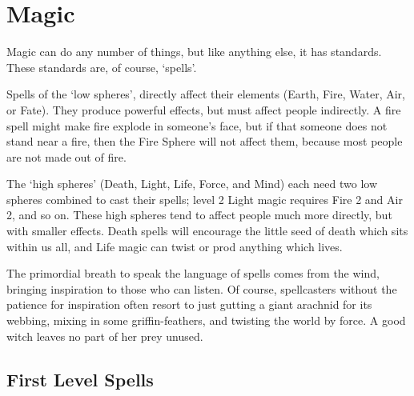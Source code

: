 \chapter[Chamber of Magic]{Magic}
\toggletrue{examplecharacter}

\begin{multicols}{2}

\noindent
Magic can do any number of things, but like anything else, it has standards.
These standards are, of course, `spells'.

Spells of the `low spheres', directly affect their elements (Earth, Fire, Water, Air, or Fate).
They produce powerful effects, but must affect people indirectly.
A fire spell might make fire explode in someone's face, but if that someone does not stand near a fire, then the Fire Sphere will not affect them, because most people are not made out of fire.

The `high spheres' (Death, Light, Life, Force, and Mind) each need two low spheres combined to cast their spells; level 2 Light magic requires Fire 2 and Air 2, and so on.
These high spheres tend to affect people much more directly, but with smaller effects.
Death spells will encourage the little seed of death which sits within us all, and Life magic can twist or prod anything which lives.

The primordial breath to speak the language of spells comes from the wind, bringing inspiration to those who can listen.
Of course, spellcasters without the patience for inspiration often resort to just gutting a giant arachnid for its webbing, mixing in some griffin-feathers, and twisting the world by force.
A good witch leaves no part of her prey unused.



\end{multicols}

\section{First Level Spells}

